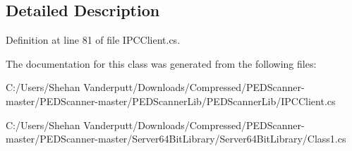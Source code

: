 \subsection{Detailed Description}


Definition at line 81 of file I\+P\+C\+Client.\+cs.



The documentation for this class was generated from the following files\+:\begin{DoxyCompactItemize}
\item 
C\+:/\+Users/\+Shehan Vanderputt/\+Downloads/\+Compressed/\+P\+E\+D\+Scanner-\/master/\+P\+E\+D\+Scanner-\/master/\+P\+E\+D\+Scanner\+Lib/\+P\+E\+D\+Scanner\+Lib/I\+P\+C\+Client.\+cs\item 
C\+:/\+Users/\+Shehan Vanderputt/\+Downloads/\+Compressed/\+P\+E\+D\+Scanner-\/master/\+P\+E\+D\+Scanner-\/master/\+Server64\+Bit\+Library/\+Server64\+Bit\+Library/Class1.\+cs\end{DoxyCompactItemize}
